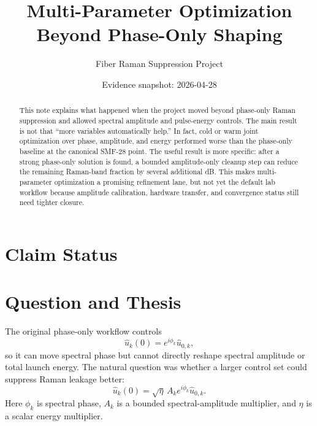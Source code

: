 \documentclass[11pt]{article}
\title{Multi-Parameter Optimization Beyond Phase-Only Shaping}
\author{Fiber Raman Suppression Project}
\date{Evidence snapshot: 2026-04-28}
\newcommand{\Avar}{A}
\newcommand{\Escale}{\eta}
\begin{document}
\maketitle

\begin{abstract}
This note explains what happened when the project moved beyond phase-only Raman suppression and allowed spectral amplitude and pulse-energy controls. The main result is not that ``more variables automatically help.'' In fact, cold or warm joint optimization over phase, amplitude, and energy performed worse than the phase-only baseline at the canonical SMF-28 point. The useful result is more specific: after a strong phase-only solution is found, a bounded amplitude-only cleanup step can reduce the remaining Raman-band fraction by several additional dB. This makes multi-parameter optimization a promising refinement lane, but not yet the default lab workflow because amplitude calibration, hardware transfer, and convergence status still need tighter closure.
\end{abstract}

\section*{Claim Status}

\section{Question and Thesis}
The original phase-only workflow controls
\[
    \hat u_k(0)=e^{i\phi_k}\hat u_{0,k},
\]
so it can move spectral phase but cannot directly reshape spectral amplitude or total launch energy. The natural question was whether a larger control set could suppress Raman leakage better:
\[
    \hat u_k(0)=\sqrt{\Escale}\,\Avar_k e^{i\phi_k}\hat u_{0,k}.
\]
Here $\phi_k$ is spectral phase, $\Avar_k$ is a bounded spectral-amplitude multiplier, and $\Escale$ is a scalar energy multiplier.
\end{document}
